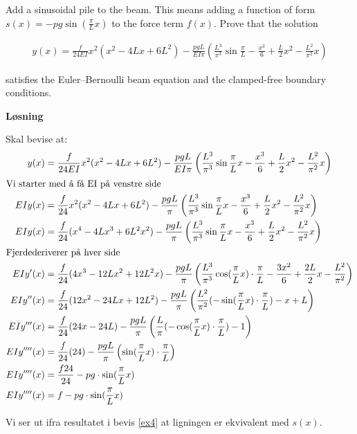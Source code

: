 %


Add a sinusoidal pile to the beam. This means adding a function of form $s(x)=-pg\sin(\frac{\pi}{L}x)$ to the force term $f(x)$. Prove that the solution

\begin{align}
y(x) = \frac{f}{{24EI}}{x^2}({x^2} - 4Lx + 6{L^2}) - \frac{{pgL}}{{EI\pi }}\left( {\frac{{{L^3}}}{{{\pi ^3}}}\sin \frac{\pi }{L} - \frac{{{x^3}}}{6} + \frac{L}{2}{x^2} - \frac{{{L^2}}}{{{\pi ^2}}}x} \right)
\end{align}

satisfies the Euler–Bernoulli beam equation and the clamped-free boundary conditions.

\vspace{5mm}
\textbf{Løsning}

Skal bevise at: 
\begin{align}
\label{ex4}
y(x) &= \frac{f}{{24EI}}{x^2}({x^2} - 4Lx + 6{L^2}) - \frac{{pgL}}{{EI\pi }}\left( {\frac{{{L^3}}}{{{\pi ^3}}}\sin \frac{\pi }{L}x - \frac{{{x^3}}}{6} + \frac{L}{2}{x^2} - \frac{{{L^2}}}{{{\pi ^2}}}x} \right)\nonumber\\ 
\intertext{Vi starter med å få EI på venstre side}
EIy(x) &= \frac{f}{{24}}{x^2}({x^2} - 4Lx + 6{L^2}) - \frac{{pgL}}{{\pi }}\left( {\frac{{{L^3}}}{{{\pi ^3}}}\sin \frac{\pi }{L}x - \frac{{{x^3}}}{6} + \frac{L}{2}{x^2} - \frac{{{L^2}}}{{{\pi ^2}}}x} \right)\nonumber\\
EIy(x) &= \frac{f}{{24}}({x^4} - 4Lx^3 + 6{L^2}{x^2}) - \frac{{pgL}}{{\pi }}\left( {\frac{{{L^3}}}{{{\pi ^3}}}\sin \frac{\pi }{L}x - \frac{{{x^3}}}{6} + \frac{L}{2}{x^2} - \frac{{{L^2}}}{{{\pi ^2}}}x} \right)\nonumber\\
\intertext{Fjerdederiverer på hver side}
EIy'(x) &= \frac{f}{{24}}(4{x^3} - 12Lx^2 + 12{L^2}x) - \frac{{pgL}}{{\pi }}\left( {\frac{{{L^3}}}{{{\pi ^3}}}\cos (\frac{\pi }{L}x) \cdot \frac{\pi}{L} - \frac{{{3x^2}}}{6} + \frac{2L}{2}x - \frac{{{L^2}}}{{{\pi ^2}}}} \right)\nonumber\\
EIy''(x) &= \frac{f}{{24}}(12{x^2} - 24Lx + 12{L^2}) - \frac{{pgL}}{{\pi }}\left( {\frac{{{L^2}}}{{{\pi ^2}}}(-\sin (\frac{\pi }{L}x) \cdot \frac{\pi}{L}) - x + L } \right)\nonumber\\
EIy'''(x) &= \frac{f}{{24}}(24x - 24L) - \frac{{pgL}}{{\pi }}\left( {\frac{{{L}}}{{{\pi}}}(-\cos (\frac{\pi }{L}x) \cdot \frac{\pi}{L} )- 1 } \right)\nonumber\\
EIy''''(x) &= \frac{f}{{24}}(24) - \frac{{pgL}}{{\pi }}\left( {\sin (\frac{\pi }{L}x) \cdot \frac{\pi}{L}  } \right)\nonumber\\
EIy''''(x) &= \frac{f24}{24} - {pg} \cdot{\sin (\frac{\pi }{L}x) } \nonumber\\
EIy''''(x) &= f - {pg} \cdot{\sin (\frac{\pi }{L}x) } \nonumber\\
\end{align}

Vi ser ut ifra resultatet i bevis \ref{ex4} at ligningen er ekvivalent med $s(x)$. 


%